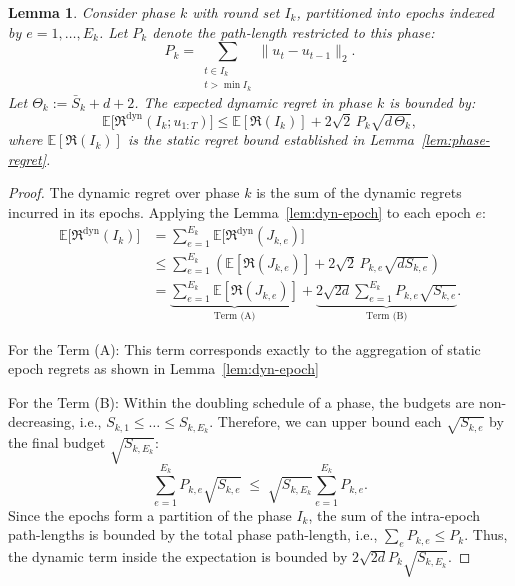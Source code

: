 \documentclass[journal,onecolumn]{IEEEtran}
\theoremstyle{plain}
\newtheorem{lemma}[theorem]{Lemma}
\theoremstyle{definition}
\theoremstyle{remark}
\newcommand{\regret}{\mathfrak{R}}
\begin{document}
{\iffalse
\begin{lemma}
    \label{lem:dyn-phase} Consider phase $k$ with round set $I_{k}$, partitioned
    into epochs indexed by $e=1, \dots, E_{k}$. Let $P_{k}$ denote the path-length
    restricted to this phase:
    \begin{equation*}
        P_{k} = \sum_{\substack{t \in I_k \\ t > \min I_k}}\|u_{t} - u_{t-1}\|_{2}
        .
    \end{equation*}
    Let $\Theta_{k} := \bar S_{k} + d + 2$. The expected dynamic regret in phase
    $k$ is bounded by:
    \begin{equation*}
        \mathbb{E}\bigl[\regret^{\mathrm{dyn}}(I_{k}; u_{1:T})\bigr] \le\mathbb{E}
        [\regret(I_{k})] +2\sqrt{2}\, P_{k} \sqrt{d\,\Theta_{k}},
    \end{equation*}
    where $\mathbb{E}[\regret(I_{k})]$ is the static regret bound established in
    Lemma~\ref{lem:phase-regret}.
\end{lemma}

\begin{proof}
    The dynamic regret over phase $k$ is the sum of the dynamic regrets incurred
    in its epochs. Applying the Lemma~\ref{lem:dyn-epoch} to each epoch $e$:
    \begin{align*}
        \mathbb{E}\bigl[\regret^{\mathrm{dyn}}(I_{k})\bigr] & = \sum_{e=1}^{E_k}\mathbb{E}\bigl[\regret^{\mathrm{dyn}}(J_{k,e})\bigr]                                                                                           \\
                                                            & \le \sum_{e=1}^{E_k}\left( \mathbb{E}[\regret(J_{k,e})] + 2\sqrt{2}\, P_{k,e}\sqrt{d S_{k,e}}\right)                                                              \\
                                                            & = \underbrace{\sum_{e=1}^{E_k} \mathbb{E}[\regret(J_{k,e})]}_{\text{Term (A)}}+\underbrace{2\sqrt{2d} \sum_{e=1}^{E_k} P_{k,e} \sqrt{S_{k,e}}}_{\text{Term (B)}}.
    \end{align*}

    For the Term (A): This term corresponds exactly to the aggregation of static
    epoch regrets as shown in Lemma~\ref{lem:dyn-epoch}

    For the Term (B): Within the doubling schedule of a phase, the budgets are
    non-decreasing, i.e., $S_{k,1}\le \dots \le S_{k,E_k}$. Therefore, we can upper
    bound each $\sqrt{S_{k,e}}$ by the final budget $\sqrt{S_{k,E_k}}$:
    \begin{equation*}
        \sum_{e=1}^{E_k}P_{k,e}\sqrt{S_{k,e}}\;\le\; \sqrt{S_{k,E_k}}\sum_{e=1}^{E_k}
        P_{k,e}.
    \end{equation*}
    Since the epochs form a partition of the phase $I_{k}$, the sum of the intra-epoch
    path-lengths is bounded by the total phase path-length, i.e.,
    $\sum_{e} P_{k,e}\le P_{k}$. Thus, the dynamic term inside the expectation
    is bounded by $2\sqrt{2d}P_{k} \sqrt{S_{k,E_k}}$.


\end{proof}}
\end{document}
